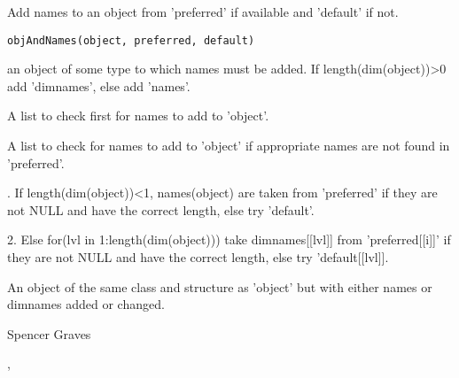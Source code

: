 \documentclass{article}
\begin{document}
\begin{Description}\relax
Add names to an object from 'preferred' if available and 'default' if
not.
\end{Description}
\begin{Usage}
\begin{verbatim}
objAndNames(object, preferred, default)
\end{verbatim}
\end{Usage}
\begin{Arguments}
\begin{ldescription}
\item[\code{object}] an object of some type to which names must be added.  If
length(dim(object))>0 add 'dimnames', else add 'names'.  

\item[\code{preferred}] A list to check first for names to add to 'object'.  

\item[\code{default}] A list to check for names to add to 'object' if appropriate names
are not found in 'preferred'.  

\end{ldescription}
\end{Arguments}
\begin{Details}.  If length(dim(object))<1, names(object) are taken from 'preferred'
if they are not NULL and have the correct length, else try 'default'.

2.  Else for(lvl in 1:length(dim(object))) take dimnames[[lvl]] from
'preferred[[i]]' if they are not NULL and have the correct length,
else try 'default[[lvl]].
\end{Details}
\begin{Value}
An object of the same class and structure as 'object' but with either
names or dimnames added or changed.
\end{Value}
\begin{Author}\relax
Spencer Graves
\end{Author}
\begin{SeeAlso}\relax
{}, 
\end{SeeAlso}
\end{document}
